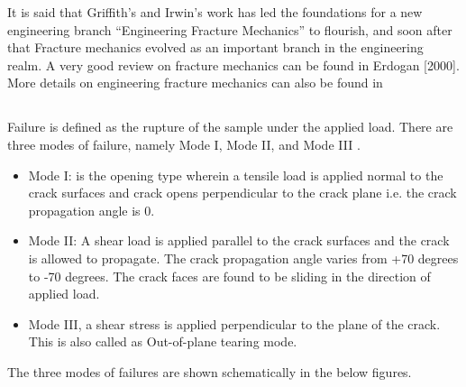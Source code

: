 \documentclass[fleqn, 12.5pt,a4paper]{report}
\begin{document}
It is said that Griffith’s and Irwin’s work has led the foundations for a new engineering branch “Engineering Fracture Mechanics” to flourish, and soon after that Fracture mechanics evolved as an important branch in the engineering realm. 
A very good review on fracture mechanics can be found in Erdogan [2000]. More details on engineering fracture mechanics can also be found in \cite{kuna2013finite}

\subsection{\color{Black}{Modes of Failure}}
Failure is defined as the rupture of the sample under the applied load. There are three modes of failure, namely Mode I, Mode II, and Mode III \cite{kuna2013finite}.
\begin{itemize}
    \item Mode I: is the opening type wherein a tensile load is applied normal to the crack surfaces and crack opens perpendicular to the crack plane i.e. the crack propagation angle is 0.
    \item Mode II: A shear load is applied parallel to the crack surfaces and the crack is allowed to propagate. The crack propagation angle varies from +70 degrees to -70 degrees. The crack faces are found to be sliding in the direction of applied load.
    \item Mode III, a shear stress is applied perpendicular to the plane of the crack. This is also called as Out-of-plane tearing mode.
\end{itemize}
The three modes of failures are shown schematically in the below figures.
\end{document}
